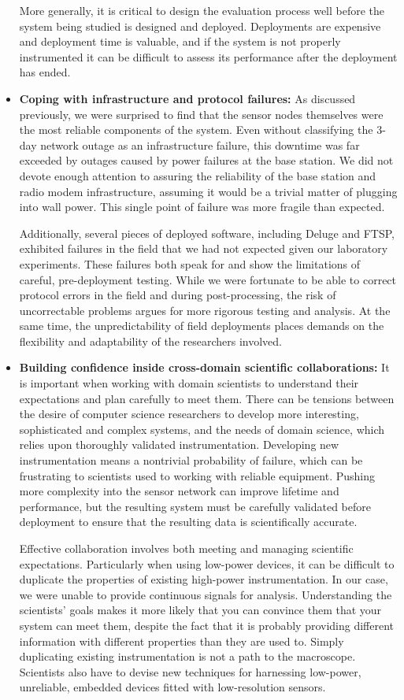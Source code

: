 \begin{itemize}
More generally, it is critical to design the evaluation process well before
the system being studied is designed and deployed. Deployments are expensive
and deployment time is valuable, and if the system is not properly
instrumented it can be difficult to assess its performance after the
deployment has ended.

\item \textbf{Coping with infrastructure and protocol failures:} As discussed
previously, we were surprised to find that the sensor nodes themselves were
the most reliable components of the system. Even without classifying the
3-day network outage as an infrastructure failure, this downtime was far
exceeded by outages caused by power failures at the base station. We did not
devote enough attention to assuring the reliability of the base station and
radio modem infrastructure, assuming it would be a trivial matter of plugging
into wall power. This single point of failure was more fragile than expected.

Additionally, several pieces of deployed software, including Deluge and FTSP,
exhibited failures in the field that we had not expected given our laboratory
experiments. These failures both speak for and show the limitations of
careful, pre-deployment testing. While we were fortunate to be able to
correct protocol errors in the field and during post-processing, the risk of
uncorrectable problems argues for more rigorous testing and analysis. At the
same time, the unpredictability of field deployments places demands on the
flexibility and adaptability of the researchers involved.

\item \textbf{Building confidence inside cross-domain scientific
collaborations:} It is important when working with domain scientists to
understand their expectations and plan carefully to meet them. There can be
tensions between the desire of computer science researchers to develop more
interesting, sophisticated and complex systems, and the needs of domain
science, which relies upon thoroughly validated instrumentation. Developing
new instrumentation means a nontrivial probability of failure, which can be
frustrating to scientists used to working with reliable equipment. Pushing
more complexity into the sensor network can improve lifetime and performance,
but the resulting system must be carefully validated before deployment to
ensure that the resulting data is scientifically accurate.

Effective collaboration involves both meeting and managing scientific
expectations. Particularly when using low-power devices, it can be difficult
to duplicate the properties of existing high-power instrumentation.  In our
case, we were unable to provide continuous signals for analysis.
Understanding the scientists' goals makes it more likely that you can
convince them that your system can meet them, despite the fact that it is
probably providing different information with different properties than they
are used to. Simply duplicating existing instrumentation is not a path to the
macroscope. Scientists also have to devise new techniques for harnessing
low-power, unreliable, embedded devices fitted with low-resolution sensors.


\end{itemize}
